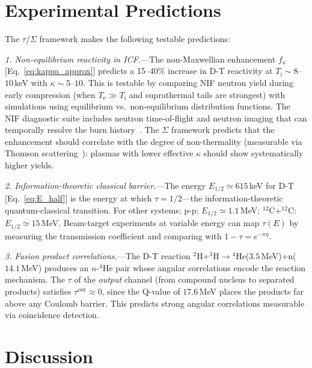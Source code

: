 \documentclass[prc,twocolumn,superscriptaddress,longbibliography,floatfix]{revtex4-2}
\newcommand{\tauasym}{\tau}
\newcommand{\Te}{T_{\mathrm{e}}}
\newcommand{\Ti}{T_{\mathrm{i}}}
\begin{document}
\section{Experimental Predictions}
\label{sec:predictions}

The $\tau$/$\Sigma$ framework makes the following testable predictions:

\textit{1. Non-equilibrium reactivity in ICF.}---The non-Maxwellian
enhancement $f_{\kappa}$ [Eq.~\eqref{eq:kappa_approx}] predicts a
15--40\% increase in D-T reactivity at
$\Ti \sim 8$--$10\,$keV with $\kappa \sim 5$--$10$.
This is testable by comparing NIF neutron yield during early
compression (when $\Te \gg \Ti$ and suprathermal tails are strongest)
with simulations using equilibrium vs.\ non-equilibrium distribution
functions.  The NIF diagnostic suite
includes neutron time-of-flight and neutron imaging that can
temporally resolve the burn history~\cite{Cerjan2018}.
The $\Sigma$ framework predicts that the enhancement should correlate
with the degree of non-thermality (measurable via Thomson
scattering~\cite{Glenzer2009}): plasmas with lower effective $\kappa$
should show systematically higher yields.

\textit{2. Information-theoretic classical barrier.}---The energy
$E_{1/2} \simeq 615\,$keV for D-T [Eq.~\eqref{eq:E_half}] is the
energy at which $\tauasym = 1/2$---the information-theoretic
quantum-classical transition.
For other systems: p-p: $E_{1/2}\simeq 1.1\,$MeV;
${}^{12}$C+${}^{12}$C: $E_{1/2}\simeq 15\,$MeV.
Beam-target experiments at variable energy can map $\tauasym(E)$
by measuring the transmission coefficient and comparing with
$1 - \tauasym = e^{-\pi\eta}$.

\textit{3. Fusion product correlations.}---The D-T reaction
${}^{2}$H+${}^{3}$H$\to {}^{4}$He($3.5\,$MeV)+n($14.1\,$MeV)
produces an $n$-${}^{4}$He pair whose angular correlations encode the
reaction mechanism.  The $\tauasym$ of the \emph{output} channel
(from compound nucleus to separated products) satisfies
$\tauasym^{\mathrm{out}} \approx 0$, since the Q-value of
$17.6\,$MeV places the products far above any Coulomb barrier.
This predicts strong angular correlations measurable via
coincidence detection.

\section{Discussion}
\label{sec:discussion}
\end{document}
